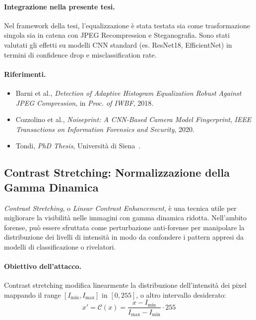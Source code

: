 \paragraph{Integrazione nella presente tesi.}
Nel framework della tesi, l'equalizzazione è stata testata sia come trasformazione singola sia in catena con JPEG Recompression e Steganografia. Sono stati valutati gli effetti su modelli CNN standard (es. ResNet18, EfficientNet) in termini di confidence drop e misclassification rate.

\paragraph{Riferimenti.}
\begin{itemize}
    \item Barni et al., \textit{Detection of Adaptive Histogram Equalization Robust Against JPEG Compression}, in \textit{Proc. of IWBF}, 2018.
    \item Cozzolino et al., \textit{Noiseprint: A CNN-Based Camera Model Fingerprint}, \textit{IEEE Transactions on Information Forensics and Security}, 2020.
    \item Tondi, \textit{PhD Thesis}, Università di Siena~\cite{phd_unisi_068552}.
\end{itemize}





\subsection{Contrast Stretching: Normalizzazione della Gamma Dinamica}
\label{sec:contrast_stretching}

\textit{Contrast Stretching}, o \textit{Linear Contrast Enhancement}, è una tecnica utile per migliorare la visibilità nelle immagini con gamma dinamica ridotta. Nell’ambito forense, può essere sfruttata come perturbazione anti-forense per manipolare la distribuzione dei livelli di intensità in modo da confondere i pattern appresi da modelli di classificazione o rivelatori.

\paragraph{Obiettivo dell’attacco.}
Contrast stretching modifica linearmente la distribuzione dell’intensità dei pixel mappando il range $[I_{\min}, I_{\max}]$ in $[0, 255]$, o altro intervallo desiderato:
\[
x' = \mathcal{C}(x) = \frac{x - I_{\min}}{I_{\max} - I_{\min}} \cdot 255
\]

